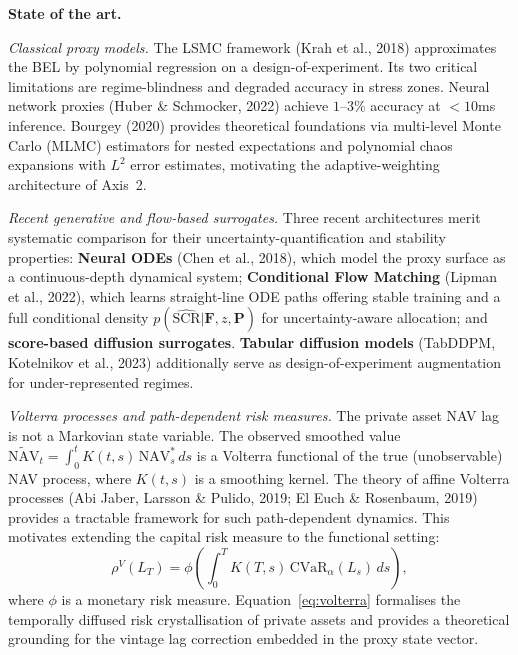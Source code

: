 \documentclass[11pt,a4paper]{article}
\begin{document}
\noindent\textbf{State of the art.}

\textit{Classical proxy models.}
The LSMC framework (Krah et al., 2018) approximates the BEL by polynomial
regression on a design-of-experiment. Its two critical limitations are
regime-blindness and degraded accuracy in stress zones. Neural network proxies
(Huber \& Schmocker, 2022) achieve $1$--$3\%$ accuracy at $<10$ms inference.
Bourgey (2020) provides theoretical foundations via multi-level Monte Carlo
(MLMC) estimators for nested expectations and polynomial chaos expansions with
$L^2$ error estimates, motivating the adaptive-weighting architecture of
Axis~2.

\textit{Recent generative and flow-based surrogates.}
Three recent architectures merit systematic comparison for their
uncertainty-quantification and stability properties:
\textbf{Neural ODEs} (Chen et al., 2018), which model the proxy surface as a
continuous-depth dynamical system; \textbf{Conditional Flow Matching} (Lipman
et al., 2022), which learns straight-line ODE paths offering stable training
and a full conditional density
$p(\widehat{\mathrm{SCR}} | \mathbf{F}, z, \mathbf{P})$ for uncertainty-aware
allocation; and \textbf{score-based diffusion surrogates}. \textbf{Tabular
diffusion models} (TabDDPM, Kotelnikov et al., 2023) additionally serve as
design-of-experiment augmentation for under-represented regimes.

\textit{Volterra processes and path-dependent risk measures.}
The private asset NAV lag is not a Markovian state variable. The observed
smoothed value
$\widetilde{\mathrm{NAV}}_t = \int_0^t K(t,s)\,\mathrm{NAV}^*_s\,ds$
is a Volterra functional of the true (unobservable) NAV process, where $K(t,s)$
is a smoothing kernel. The theory of affine Volterra processes (Abi Jaber,
Larsson \& Pulido, 2019; El Euch \& Rosenbaum, 2019) provides a tractable
framework for such path-dependent dynamics. This motivates extending the
capital risk measure to the functional setting:
\begin{equation}
  \rho^V(L_T)
  = \phi\!\left(\int_0^T K(T,s)\,\mathrm{CVaR}_\alpha(L_s)\,ds\right),
\label{eq:volterra}
\end{equation}
where $\phi$ is a monetary risk measure. Equation~\eqref{eq:volterra}
formalises the temporally diffused risk crystallisation of private assets and
provides a theoretical grounding for the vintage lag correction embedded in the
proxy state vector.
\end{document}
